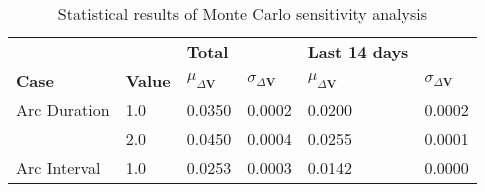 \begin{table}[h!]
\centering
\begin{tabular}{llllll}
 &  & \cellcolor[HTML]{EFEFEF}\textbf{Total} &  & \cellcolor[HTML]{EFEFEF}\textbf{Last 14 days} &  \\
\rowcolor[HTML]{EFEFEF} 
\textbf{Case} & \textbf{Value} & \textbf{$\mu_{\Delta \boldsymbol{V}}$} & \textbf{$\sigma_{\Delta \boldsymbol{V}}$} & \textbf{$\mu_{\Delta \boldsymbol{V}}$} & \textbf{$\sigma_{\Delta \boldsymbol{V}}$} \\ 
Arc Duration & 1.0 & 0.0350 & 0.0002 & 0.0200 & 0.0002 \\ 
 & 2.0 & 0.0450 & 0.0004 & 0.0255 & 0.0001 \\ 
Arc Interval & 1.0 & 0.0253 & 0.0003 & 0.0142 & 0.0000 \\ 
\end{tabular}
\caption{Statistical results of Monte Carlo sensitivity analysis}
\label{tab:SensitivityAnalysis}
\end{table}